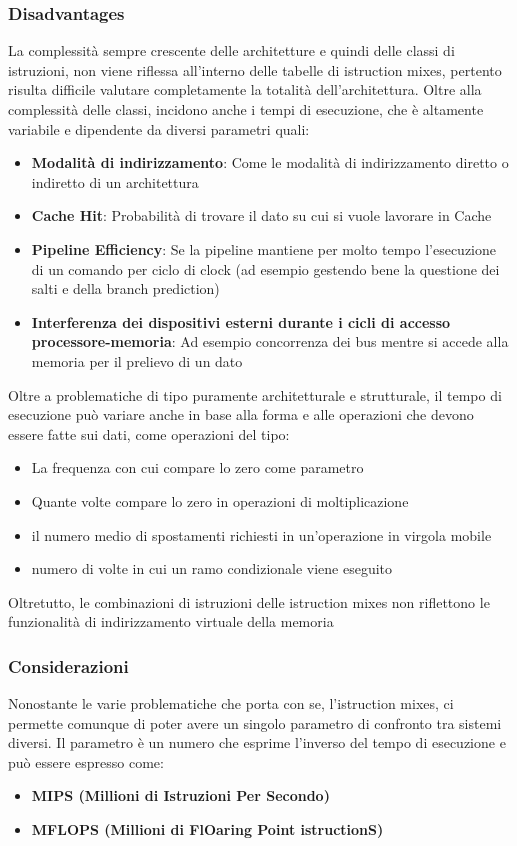 \subsubsection{Disadvantages}
La complessità sempre crescente delle architetture e quindi delle classi di istruzioni, non viene riflessa all'interno delle tabelle di istruction mixes, pertento risulta difficile valutare completamente la totalità dell'architettura. Oltre alla complessità delle classi, incidono anche i tempi di esecuzione, che è altamente variabile e dipendente da diversi parametri quali:
\begin{itemize}
    \item \textbf{Modalità di indirizzamento}: Come le modalità di indirizzamento diretto o indiretto di un architettura
    \item \textbf{Cache Hit}: Probabilità di trovare il dato su cui si vuole lavorare in Cache
    \item \textbf{Pipeline Efficiency}: Se la pipeline mantiene per molto tempo l'esecuzione di un comando per ciclo di clock (ad esempio gestendo bene la questione dei salti e della branch prediction)
    \item \textbf{Interferenza dei dispositivi esterni durante i cicli di accesso processore-memoria}: Ad esempio concorrenza dei bus mentre si accede alla memoria per il prelievo di un dato
\end{itemize}

Oltre a problematiche di tipo puramente architetturale e strutturale, il tempo di esecuzione può variare anche in base alla forma e alle operazioni che devono essere fatte sui dati, come operazioni del tipo:
\begin{itemize}
    \item La frequenza con cui compare lo zero come parametro
    \item Quante volte compare lo zero in operazioni di moltiplicazione
    \item il numero medio di spostamenti richiesti in un'operazione in virgola mobile
    \item numero di volte in cui un ramo condizionale viene eseguito 
\end{itemize}

Oltretutto, le combinazioni di istruzioni delle istruction mixes non riflettono le funzionalità di indirizzamento virtuale della memoria

\subsubsection{Considerazioni}
Nonostante le varie problematiche che porta con se, l'istruction mixes, ci permette comunque di poter avere un singolo parametro di confronto tra sistemi diversi. Il parametro è un numero che esprime l'inverso del tempo di esecuzione e può essere espresso come:
\begin{itemize}
    \item \textbf{MIPS (Millioni di Istruzioni Per Secondo)}
    \item \textbf{MFLOPS (Millioni di FlOaring Point istructionS)}
\end{itemize}

